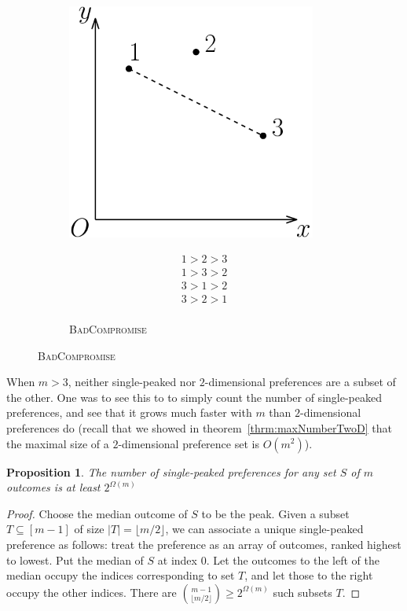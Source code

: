 \documentclass[12pt]{article}
\newtheorem{proposition}[theorem]{Proposition}
\newcommand{\1}[1]{\mathds{1}[{#1}]}
\begin{document}
\begin{figure}[h]
\begin{subfigure}[t]{0.45\textwidth}
\begin{minipage}{0.55\textwidth}
        \includegraphics[width=0.9\textwidth]{figures/exGoodComp}
      \end{minipage}\hfill
      \begin{minipage}{0.45\textwidth}
        \begin{align*}
          1 > 2 > 3 \\
          1 > 3 > 2 \\
          3 > 1 > 2 \\
          3 > 2 > 1 \\
        \end{align*}
      \end{minipage}
      \caption{\textsc{BadCompromise}}
      \label{fig:gull}
    \end{subfigure}
  \end{figure}

  When $m>3$, neither single-peaked nor $2$-dimensional preferences
  are a subset of the other. One was to see this to to simply
  count the number of single-peaked preferences, and see that it
  grows much faster with $m$ than $2$-dimensional preferences do
  (recall that we showed in theorem~\ref{thrm:maxNumberTwoD}
  that the maximal size of a $2$-dimensional
  preference set is $O(m^2)$).
  \begin{proposition}
    The number of single-peaked preferences for any set $S$ of $m$ outcomes
    is at least $2^{\Omega(m)}$
  \end{proposition}
  \begin{proof}
    Choose the median outcome of $S$ to be the peak.
    Given a subset $T\subseteq [m-1]$ of size $|T| = \lfloor m/2\rfloor$,
    we can associate a
    unique single-peaked preference as follows:
    treat the preference as an array of outcomes, ranked highest to lowest.
    Put the median of $S$ at index $0$.
    Let the outcomes to the left of the median occupy the indices corresponding
    to set $T$, and let those to the right occupy the other indices.
    There are ${m-1 \choose \lfloor m/2\rfloor } \ge 2^{\Omega(m)}$ such
    subsets $T$.
  \end{proof}
\end{document}
